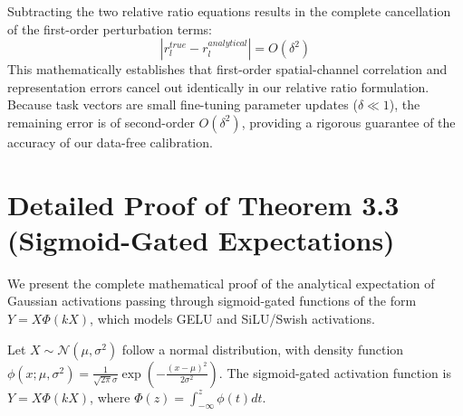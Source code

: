 \documentclass{article}
\theoremstyle{plain}
\theoremstyle{definition}
\theoremstyle{remark}
\begin{document}
Subtracting the two relative ratio equations results in the complete cancellation of the first-order perturbation terms:
\begin{equation}
    \left| r^{true}_l - r^{analytical}_l \right| = O(\delta^2)
\end{equation}
This mathematically establishes that first-order spatial-channel correlation and representation errors cancel out identically in our relative ratio formulation. Because task vectors are small fine-tuning parameter updates ($\delta \ll 1$), the remaining error is of second-order $O(\delta^2)$, providing a rigorous guarantee of the accuracy of our data-free calibration.

\section{Detailed Proof of Theorem 3.3 (Sigmoid-Gated Expectations)}
\label{app:modern_activations}

We present the complete mathematical proof of the analytical expectation of Gaussian activations passing through sigmoid-gated functions of the form $Y = X \Phi(k X)$, which models GELU and SiLU/Swish activations.

Let $X \sim \mathcal{N}(\mu, \sigma^2)$ follow a normal distribution, with density function $\phi(x; \mu, \sigma^2) = \frac{1}{\sqrt{2\pi}\sigma} \exp\left(-\frac{(x-\mu)^2}{2\sigma^2}\right)$. The sigmoid-gated activation function is $Y = X \Phi(k X)$, where $\Phi(z) = \int_{-\infty}^{z} \phi(t) dt$.
\end{document}
